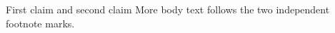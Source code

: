\documentclass{article}
\begin{document}
First claim
and second claim
More body text follows the two independent footnote marks.
\end{document}
